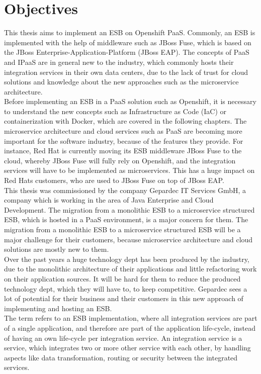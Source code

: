 \section{Objectives}
\label{sec:intro-objectives}
This thesis aims to implement an ESB on Openshift PaaS. Commonly, an ESB is implemented with the help of middleware such as JBoss Fuse, which is based on the JBoss Enterprise-Application-Platform (JBoss EAP). The concepts of PaaS and IPaaS are in general new to the industry, which commonly hosts their integration services in their own data centers, due to the lack of trust for cloud solutions and knowledge about the new approaches such as the microservice architecture\cite{Openshift2018}. \\

Before implementing an ESB in a PaaS solution such as Openshift, it is necessary to understand the new concepts such as Infrastructure as Code (IaC) or containerization with Docker, which are covered in the following chapters. The microservice architecture and cloud services such as PaaS are becoming more important for the software industry, because of the features they provide. For instance, Red Hat is currently moving its ESB middleware JBoss Fuse to the cloud, whereby JBoss Fuse will fully rely on Openshift, and the integration services will have to be implemented as microservices. This has a huge impact on Red Hats customers, who are used to JBoss Fuse on top of JBoss EAP. \\

This thesis was commissioned by the company Gepardec IT Services GmbH, a company which is working in the area of Java Enterprise and Cloud Development. The migration from a monolithic ESB to a microservice structured ESB, which is hosted in a PaaS environment, is a major concern for them. The migration from a monolithic ESB to a microservice structured ESB will be a major challenge for their customers, because microservice architecture and cloud solutions are mostly new to them.  \\

Over the past years a huge technology dept has been produced by the industry, due to the monolithic architecture of their applications and little refactoring work on their application sources. It will be hard for them to reduce the produced technology dept, which they will have to, to keep competitive. Gepardec sees a lot of potential for their business and their customers in this new approach of implementing and hosting an ESB. \\

The term  refers to an ESB implementation, where all integration services are part of a single application, and therefore are part of the application life-cycle, instead of having an own life-cycle per integration service. An integration service is a service, which integrates two or more other service with each other, by handling aspects like data transformation, routing or security between the integrated services.  